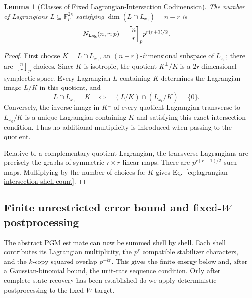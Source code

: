 \documentclass[11pt]{article}
\newcommand{\F}{\mathbb F}
\newcommand{\1}{\mathbf 1}
\theoremstyle{plain}
\newtheorem{lemma}[theorem]{Lemma}
\theoremstyle{definition}
\theoremstyle{remark}
\begin{document}
\begin{lemma}[Classes of Fixed Lagrangian-Intersection Codimension]
\label{lem:lagrangian-intersection-shells}
The number of Lagrangians $L\subseteq\F_p^{2n}$ satisfying
$\dim(L\cap L_{x_0})=n-r$ is
\begin{equation}
 N_{\rm Lag}(n,r;p)
 =\genfrac{[}{]}{0pt}{}{n}{r}_p p^{r(r+1)/2}.
 \label{eq:lagrangian-intersection-shell-count}
\end{equation}
\end{lemma}
\begin{proof}
First choose
$K=L\cap L_{x_0}$, an $(n-r)$-dimensional subspace of $L_{x_0}$; there are
$\genfrac{[}{]}{0pt}{}{n}{r}_p$ choices.  Since $K$ is isotropic, the quotient
$K^\perp/K$ is a $2r$-dimensional symplectic space.  Every Lagrangian $L$
containing $K$ determines the Lagrangian image $L/K$ in this quotient, and
\begin{equation}
 L\cap L_{x_0}=K
 \quad\Longleftrightarrow\quad
 (L/K)\cap(L_{x_0}/K)=\{0\}.
 \label{eq:lagrangian-shell-quotient-transversality}
\end{equation}
Conversely, the inverse image in $K^\perp$ of every quotient Lagrangian
transverse to $L_{x_0}/K$ is a unique Lagrangian containing $K$ and satisfying
this exact intersection condition.  Thus no additional multiplicity is
introduced when passing to the quotient.

Relative to a complementary quotient Lagrangian, the transverse Lagrangians
are precisely the graphs of symmetric $r\times r$ linear maps.  There are
$p^{r(r+1)/2}$ such maps.  Multiplying by the number of choices for $K$ gives
Eq.~\eqref{eq:lagrangian-intersection-shell-count}.
\end{proof}

\subsection{Finite unrestricted error bound and fixed-\texorpdfstring{$W$}{W} postprocessing}
\label{subsec:direct-finite-bound-postprocessing}

The abstract PGM estimate can now be summed shell by shell.  Each shell
contributes its Lagrangian multiplicity, the $p^r$ compatible stabilizer
characters, and the $k$-copy squared overlap $p^{-kr}$.  This gives the finite
energy below and, after a Gaussian-binomial bound, the unit-rate sequence
condition.  Only after complete-state recovery has been established do we
apply deterministic postprocessing to the fixed-$W$ target.
\end{document}
